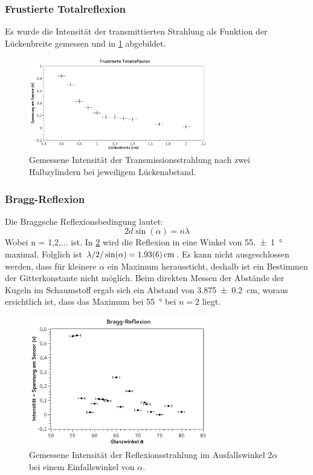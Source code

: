 \documentclass[
	a4paper,
	12pt,
	pagesize,
	ngerman
]{scrartcl}
\begin{document}
	\subsubsection{Frustierte Totalreflexion}
	Es wurde die Intensität der transmittierten Strahlung als Funktion der Lückenbreite gemessen und in \cref{fig_frust_total} abgebildet.
	\begin{figure}[H]
		\includegraphics[width=0.7\textwidth]{fig_frust_total}
		\centering
		\caption{Gemessene Intensität der Transmissionsstrahlung nach zwei Halbzylindern bei jeweiligem Lückenabstand.}
		\label{fig_frust_total}
		\centering
	\end{figure}

	\subsubsection{Bragg-Reflexion}
	Die Braggsche Reflexionsbedingung lautet:
	\begin{equation}
		2d \sin(\alpha) = n \lambda
	\end{equation}
	Wobei n = 1,2,... ist.
	In \cref{fig_bragg} wird die Reflexion in eine Winkel von \SI{55,+-1}{\degree} maximal.
	Folglich ist $\lambda/2/\sin(\alpha) = \SI{1,93+-0,06}{cm}$.
	Es kann nicht ausgeschlossen werden, dass für kleinere $\alpha$ ein Maximum heraussticht, deshalb ist ein Bestimmen der Gitterkonstante nicht möglich.
	Beim direkten Messen der Abstände der Kugeln im Schaumstoff ergab sich ein Abstand von \SI{3,875+-0,2}{cm}, woraus ersichtlich ist, dass das Maximum bei \SI{55}{\degree} bei $n=2$ liegt.
	\begin{figure}[H]
		\includegraphics[width=0.7\textwidth]{fig_bragg}
		\centering
		\caption{Gemessene Intensität der Reflexionsstrahlung im Ausfallswinkel $2\alpha$ bei einem Einfallswinkel von $\alpha$.}
		\label{fig_bragg}
		\centering
	\end{figure}
\end{document}
